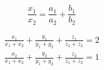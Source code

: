 \newpage
\section{
 }

\begin{figure}[h!]
	\centering
\end{figure}

\begin{equation}
	\frac{x_1}{x_2} = \frac{a_1}{a_2} + \frac{b_1}{b_2}
\end{equation}

\begin{figure}[h!]
	\centering
\end{figure}

\begin{gather}
	\frac{x_1}{x_1 + x_2} + \frac{y_1}{y_1 + y_2} + \frac{z_1}{z_1 + z_2} = 2 \\
	\frac{x_2}{x_1 + x_2} + \frac{y_2}{y_1 + y_2} + \frac{z_2}{z_1 + z_2} = 1
\end{gather}
